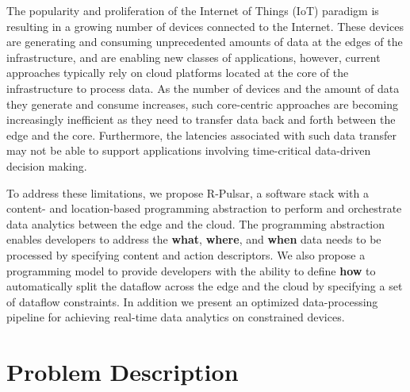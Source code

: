 The popularity and proliferation of the Internet of Things (IoT) paradigm is resulting in a growing number of devices connected to the Internet. These devices are generating and consuming unprecedented amounts of data at the edges of the infrastructure, and are enabling new classes of applications, however, current approaches typically rely on cloud
platforms located at the core of the infrastructure to process data. As the number of devices and the amount of data they generate and consume increases, such core-centric approaches are becoming increasingly inefficient as they need to transfer data back and forth between the edge and the core. Furthermore, the latencies associated with such data transfer may not be able to support applications involving time-critical data-driven decision making.


To address these limitations, we propose R-Pulsar, a software stack with a content- and location-based programming abstraction to perform and orchestrate data analytics between the edge and the cloud. The programming abstraction enables developers to address the \textbf{what}, \textbf{where}, and \textbf{when} data needs to be processed by specifying content and action descriptors. We also propose a programming model to provide developers with the ability to define \textbf{how} to automatically split the dataflow across the edge and the cloud by specifying a set of dataflow constraints. In addition we present an optimized data-processing pipeline for achieving real-time data analytics on constrained devices.

\section{Problem Description}

